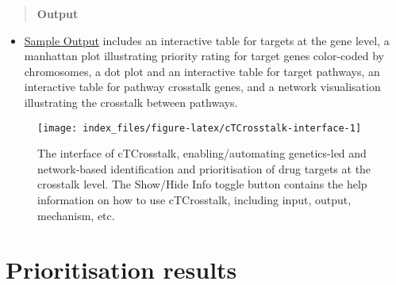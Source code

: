 \documentclass[
  oneside]{book}
\providecommand{\tightlist}{%
  \setlength{\itemsep}{0pt}\setlength{\parskip}{0pt}}
\begin{document}
\begin{quote}
\textbf{Output}
\end{quote}

\begin{itemize}
\tightlist
\item
  \href{http://www.genetictargets.com/app/examples/_tmp_RMD_cTCrosstalk.html}{Sample Output} includes an interactive table for targets at the gene level, a manhattan plot illustrating priority rating for target genes color-coded by chromosomes, a dot plot and an interactive table for target pathways, an interactive table for pathway crosstalk genes, and a network visualisation illustrating the crosstalk between pathways.
\end{itemize}

\begin{figure}

{\centering \texttt{[image: index\_files/figure-latex/cTCrosstalk-interface-1]} 

}

\caption{The interface of cTCrosstalk, enabling/automating genetics-led and network-based identification and prioritisation of drug targets at the crosstalk level. The Show/Hide Info toggle button contains the help information on how to use cTCrosstalk, including input, output, mechanism, etc.}\label{fig:cTCrosstalk-interface}
\end{figure}

\hypertarget{prioritisation-results-1}{%
\section{Prioritisation results}\label{prioritisation-results-1}}
\end{document}
